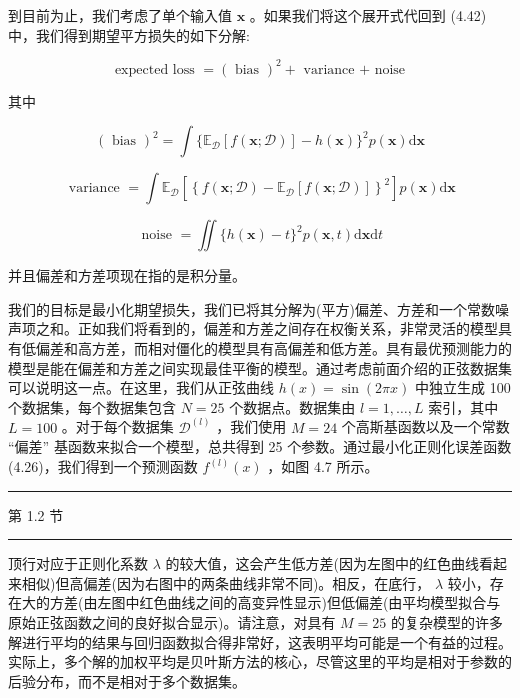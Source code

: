 \documentclass[10pt]{article}
\newcommand{\HRule}{\begin{center}\rule{0.9\linewidth}{0.2mm}\end{center}}
\begin{document}
到目前为止，我们考虑了单个输入值 \(\mathbf{x}\) 。如果我们将这个展开式代回到 (4.42) 中，我们得到期望平方损失的如下分解:

\[
\text{ expected loss } = {\left( \text{ bias }\right) }^{2} + \text{ variance + noise } \tag{4.46}
\]

其中

\[
{\left( \text{ bias }\right) }^{2} = \int \{ {\mathbb{E}}_{\mathcal{D}}\left\lbrack  {f\left( {\mathbf{x};\mathcal{D}}\right) }\right\rbrack   - h\left( \mathbf{x}\right) {\} }^{2}p\left( \mathbf{x}\right) \mathrm{d}\mathbf{x} \tag{4.47}
\]

\[
\text{ variance } = \int {\mathbb{E}}_{\mathcal{D}}\left\lbrack  {\left\{  f\left( \mathbf{x};\mathcal{D}\right)  - {\mathbb{E}}_{\mathcal{D}}\left\lbrack  f\left( \mathbf{x};\mathcal{D}\right) \right\rbrack  \right\}  }^{2}\right\rbrack  p\left( \mathbf{x}\right) \mathrm{d}\mathbf{x} \tag{4.48}
\]

\[
\text{ noise } = \iint \{ h\left( \mathbf{x}\right)  - t{\} }^{2}p\left( {\mathbf{x},t}\right) \mathrm{d}\mathbf{x}\mathrm{d}t \tag{4.49}
\]

并且偏差和方差项现在指的是积分量。

我们的目标是最小化期望损失，我们已将其分解为(平方)偏差、方差和一个常数噪声项之和。正如我们将看到的，偏差和方差之间存在权衡关系，非常灵活的模型具有低偏差和高方差，而相对僵化的模型具有高偏差和低方差。具有最优预测能力的模型是能在偏差和方差之间实现最佳平衡的模型。通过考虑前面介绍的正弦数据集可以说明这一点。在这里，我们从正弦曲线 \(h\left( x\right)  = \sin \left( {2\pi x}\right)\) 中独立生成 100 个数据集，每个数据集包含 \(N = {25}\) 个数据点。数据集由 \(l = 1,\ldots ,L\) 索引，其中 \(L = {100}\) 。对于每个数据集 \({\mathcal{D}}^{\left( l\right) }\) ，我们使用 \(M = {24}\) 个高斯基函数以及一个常数 “偏差” 基函数来拟合一个模型，总共得到 25 个参数。通过最小化正则化误差函数 (4.26)，我们得到一个预测函数 \({f}^{\left( l\right) }\left( x\right)\) ，如图 4.7 所示。

\HRule

第 1.2 节

\HRule

顶行对应于正则化系数 \(\lambda\) 的较大值，这会产生低方差(因为左图中的红色曲线看起来相似)但高偏差(因为右图中的两条曲线非常不同)。相反，在底行， \(\lambda\) 较小，存在大的方差(由左图中红色曲线之间的高变异性显示)但低偏差(由平均模型拟合与原始正弦函数之间的良好拟合显示)。请注意，对具有 \(M = {25}\) 的复杂模型的许多解进行平均的结果与回归函数拟合得非常好，这表明平均可能是一个有益的过程。实际上，多个解的加权平均是贝叶斯方法的核心，尽管这里的平均是相对于参数的后验分布，而不是相对于多个数据集。
\end{document}
